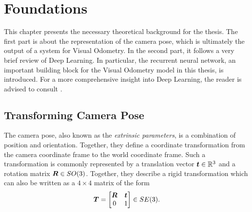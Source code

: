 \chapter{Foundations}

	This chapter presents the necessary theoretical background for the thesis.
	The first part is about the representation of the camera pose, which is ultimately the output of a system for Visual Odometry.
	In the second part, it follows a very brief review of Deep Learning.
	In particular, the recurrent neural network, an important building block for the Visual Odometry model in this thesis, is introduced.
	For a more comprehensive insight into Deep Learning, the reader is advised to consult \cite{goodfellow2016deep}.
	
	\section{Transforming Camera Pose}
		The camera pose, also known as the \emph{extrinsic parameters}, is a combination of position and orientation.
		Together, they define a coordinate transformation from the camera coordinate frame to the world coordinate frame.
		Such a transformation is commonly represented by a translation vector $\bm{t} \in \mathbb{R}^3$ and a rotation matrix $\bm{R} \in SO(3)$. 
		Together, they describe a rigid transformation which can also be written as a $4 \times 4$ matrix of the form
		\begin{equation}\label{eq:pose_representation_se3}
			\bm{T} = 
			\begin{bmatrix}
				\bm{R} 	& \bm{t} \\
				0 			& 1
			\end{bmatrix} 
			\in SE(3).
		\end{equation}
		
